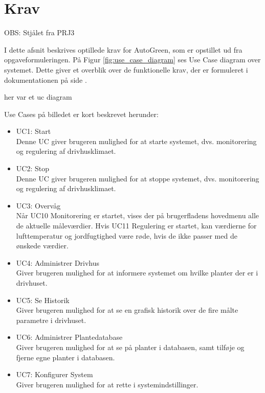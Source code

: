 \chapter{Krav}
\label{ch:Krav}

OBS: Stjålet fra PRJ3


I dette afsnit beskrives optillede krav for AutoGreen, som er opstillet ud fra opgaveformuleringen. 
På Figur \ref{fig:use_case_diagram} ses Use Case diagram over systemet. Dette giver et overblik over de funktionelle krav, der er formuleret i dokumentationen på side \pageref{P-ch:Kravspec}.

her var et uc diagram

Use Cases på billedet er kort beskrevet herunder:

\begin{itemize}

\item UC1: Start \\
Denne UC giver brugeren mulighed for at starte systemet, dvs. monitorering og regulering af drivhusklimaet.

\item UC2: Stop \\
Denne UC giver brugeren mulighed for at stoppe systemet, dvs. monitorering og regulering af
drivhusklimaet.

\item UC3: Overvåg \\
Når UC10 Monitorering er startet, vises der på brugerfladens hovedmenu alle de aktuelle måleværdier. Hvis UC11 Regulering er startet, kan værdierne for lufttemperatur og jordfugtighed være røde, hvis de ikke passer med de ønskede værdier.

\item UC4: Administrer Drivhus \\
Giver brugeren mulighed for at informere systemet om hvilke planter der er i drivhuset.

\item UC5: Se Historik \\
Giver brugeren mulighed for at se en grafisk historik over de fire målte parametre i drivhuset.

\item UC6: Administrer Plantedatabase \\
Giver brugeren mulighed for at se på planter i databasen, samt tilføje og fjerne egne planter i databasen.

\item UC7: Konfigurer System \\
Giver brugeren mulighed for at rette i systemindstillinger.


\end{itemize}
